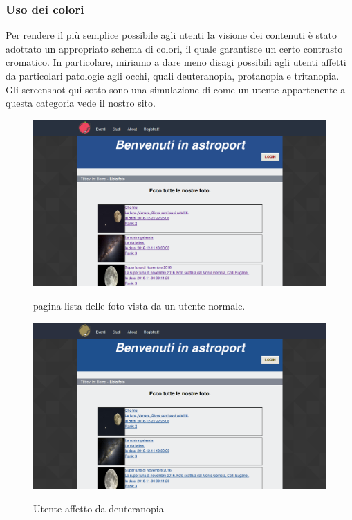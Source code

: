 	\subsubsection{Uso dei colori}
	Per rendere il più semplice possibile agli utenti la visione dei contenuti è stato adottato un appropriato schema di colori, il quale garantisce un certo contrasto cromatico.
	In particolare, miriamo a dare meno disagi possibili agli utenti affetti da particolari patologie agli occhi, quali deuteranopia, protanopia e tritanopia. \\
	Gli screenshot qui sotto sono una simulazione di come un utente appartenente a questa categoria vede il nostro sito.\\
	\begin{figure}
		\includegraphics[scale=0.3]{images/test.png}\\[1cm] \caption{pagina lista delle foto vista da un utente normale.}
	\end{figure}
	\begin{figure}
		\includegraphics[scale=0.3]{images/deuteranopia.jpg}\\[1cm] \caption{Utente affetto da deuteranopia}
	\end{figure}
